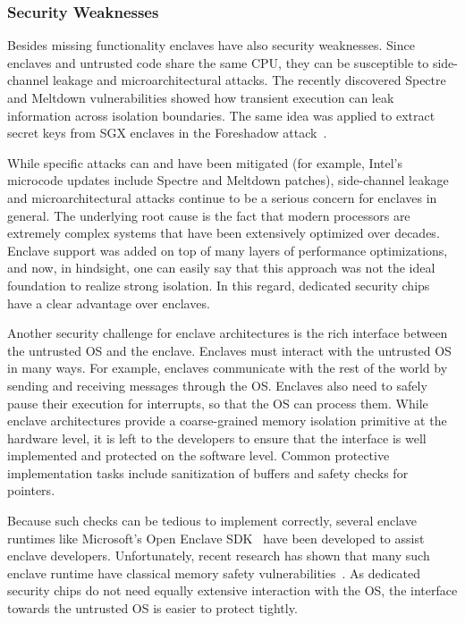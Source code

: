 \subsubsection*{Security Weaknesses}

Besides missing functionality enclaves have also security weaknesses. Since enclaves and untrusted code share the same CPU, they can be susceptible to side-channel leakage and microarchitectural attacks. The recently discovered Spectre and Meltdown vulnerabilities showed how transient execution can leak information across isolation boundaries. The same idea was applied to extract secret keys from SGX enclaves in the Foreshadow attack~\cite{van2018foreshadow}. 

While specific attacks can and have been mitigated (for example, Intel's microcode updates include Spectre and Meltdown patches), side-channel leakage and microarchitectural attacks continue to be a serious concern for enclaves in general. The underlying root cause is the fact that modern processors are extremely complex systems that have been extensively optimized over decades. Enclave support was added on top of many layers of performance optimizations, and now, in hindsight, one can easily say that this approach was not the ideal foundation to realize strong isolation. In this regard, dedicated security chips have a clear advantage over enclaves.

Another security challenge for enclave architectures is the rich interface between the untrusted OS and the enclave. Enclaves must interact with the untrusted OS in many ways. For example, enclaves communicate with the rest of the world by sending and receiving messages through the OS. Enclaves also need to safely pause their execution for interrupts, so that the OS can process them. While enclave architectures provide a coarse-grained memory isolation primitive at the hardware level, it is left to the developers to ensure that the interface is well implemented and protected on the software level. Common protective implementation tasks include sanitization of buffers and safety checks for pointers. 

Because such checks can be tedious to implement correctly, several enclave runtimes like Microsoft's Open Enclave SDK~\cite{open-enclave-sdk} have been developed to assist enclave developers. Unfortunately, recent research has shown that many such enclave runtime have classical memory safety vulnerabilities~\cite{van2019tale}. As dedicated security chips do not need equally extensive interaction with the OS, the interface towards the untrusted OS is easier to protect tightly. 



